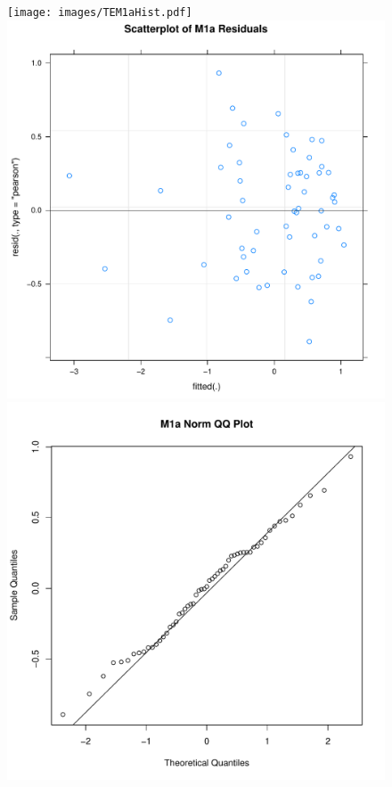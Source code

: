 \begin{figure}[htbp]
    \texttt{[image: images/TEM1aHist.pdf]}
    \includegraphics[scale =.4]{images/TEM1aScatter.pdf}
    \includegraphics[scale =.4]{images/TEM1aQQNorm.pdf}

\end{figure}
